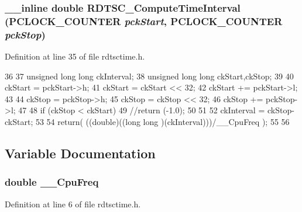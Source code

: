 \subsubsection[{RDTSC\_\-ComputeTimeInterval}]{\setlength{\rightskip}{0pt plus 5cm}\_\-\_\-inline double RDTSC\_\-ComputeTimeInterval ({\bf PCLOCK\_\-COUNTER} {\em pckStart}, \/  {\bf PCLOCK\_\-COUNTER} {\em pckStop})}\label{rdtsctime_8h_a9487a2de481d50f4bce3241f97df3cf2}


Definition at line 35 of file rdtsctime.h.


\begin{DoxyCode}
36 {
37         unsigned long long ckInterval;
38         unsigned long long ckStart,ckStop;
39 
40         ckStart  = pckStart->h;
41         ckStart  = ckStart << 32;
42         ckStart += pckStart->l;
43 
44         ckStop  = pckStop->h;
45         ckStop  = ckStop << 32;
46         ckStop += pckStop->l;
47 
48         if (ckStop < ckStart){
49                 //return (-1.0);
50         }
51 
52         ckInterval = ckStop-ckStart;
53 
54         return( ((double)((long long )(ckInterval)))/__CpuFreq );
55 
56 }
\end{DoxyCode}


\subsection{Variable Documentation}
\subsubsection[{\_\-\_\-CpuFreq}]{\setlength{\rightskip}{0pt plus 5cm}double {\bf \_\-\_\-CpuFreq}}\label{rdtsctime_8h_aa1cbe8e6dd570c720425f696ab5ae346}


Definition at line 6 of file rdtsctime.h.